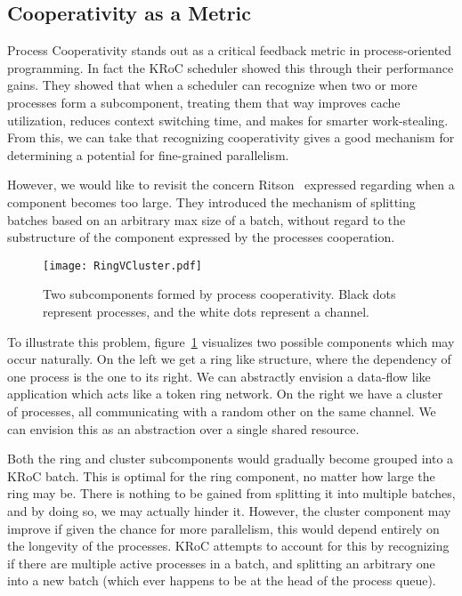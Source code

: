 \subsection{Cooperativity as a Metric}

Process Cooperativity stands out as a critical feedback metric in process-oriented
programming. In fact the KRoC scheduler showed this through their performance gains. 
They showed that when a scheduler can recognize when two or more processes form
a subcomponent, treating them that way improves cache utilization, reduces context 
switching time, and makes for smarter work-stealing. 
From this, we can take that recognizing cooperativity gives a good mechanism for
determining a potential for fine-grained parallelism. 

However, we would like to revisit the concern Ritson \etal~expressed regarding 
when a component becomes too large. They introduced the mechanism of splitting
batches based on an arbitrary max size of a batch, without regard to the 
substructure of the component expressed by the processes cooperation.

\begin{figure} 
\centering
\texttt{[image: RingVCluster.pdf]}
\caption{Two subcomponents formed by process cooperativity. Black dots 
represent processes, and the white dots represent a channel.}
\label{fig:RingVCluster}
\end{figure}

To illustrate this problem, figure~\ref{fig:RingVCluster} visualizes two 
possible components which may occur naturally. On the left we get a ring like
structure, where the dependency of one process is the one to its right.
We can abstractly envision a data-flow like application which acts like
a token ring network. On the right we have a cluster of processes, all 
communicating with a random other on the same channel. We can envision this
as an abstraction over a single shared resource.

Both the ring and cluster subcomponents would gradually become grouped into a 
KRoC batch. This is optimal for the ring component, no matter how large the 
ring may be. There is nothing to be gained from splitting it into multiple 
batches, and by doing so, we may actually hinder it. However, the cluster 
component may improve if given the chance for more parallelism, this would
depend entirely on the longevity of the processes.
KRoC attempts to account for this by recognizing if there are multiple active
processes in a batch, and splitting an arbitrary one into a new batch (which
ever happens to be at the head of the process queue). 

